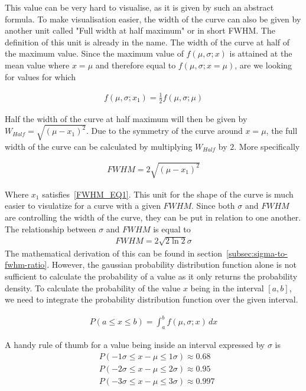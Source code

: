\documentclass[reprint,english,notitlepage]{revtex4-2}
\begin{document}
This value can be very hard to visualise, as it is given by such an abstract formula.
To make visualisation easier, the width of the curve can also be given by another unit called "Full width at half maximum" or in short FWHM.
The definition of this unit is already in the name. The width of the curve at half of the maximum value.
Since the maximum value of $f(\mu, \sigma; x)$ is attained at the mean value where $x=\mu$ and therefore equal to $f(\mu, \sigma; x=\mu)$, are we looking for values for which

\begin{align}
    f(\mu, \sigma; x_1) = \frac{1}{2} f(\mu, \sigma; \mu) \label{FWHM_EQ1}
\end{align}

Half the width of the curve at half maximum will then be given by $W_{Half} = \sqrt{(\mu - x_1)^2}$.
Due to the symmetry of the curve around $x =\mu$, the full width of the curve can be calculated by multiplying $W_{Half}$ by $2$.
More specifically

\begin{align*}
    FWHM = 2\sqrt{(\mu - x_1)^2}
\end{align*}

Where $x_1$ satisfies~\ref{FWHM_EQ1}. This unit for the shape of the curve is much easier to visulatize for a curve with a given $FWHM$.
Since both $\sigma$ and $FWHM$ are controlling the width of the curve, they can be put in relation to one another.
The relationship between $\sigma$ and $FWHM$ is equal to
\begin{align*}
    FWHM = 2\sqrt{2\ln2}\sigma
\end{align*}
The mathematical derivation of this can be found in section~\ref{subsec:sigma-to-fwhm-ratio}.
However, the gaussian probability distribution function alone is not sufficient to calculate the probability of a value as it only returns the probability density.
To calculate the probability of the value $x$ being in the interval $[a, b]$, we need to integrate the probability distribution function over the given interval.

\begin{align*}
    P(a ≤ x ≤ b) = \int_{a}^{b} f(\mu, \sigma; x) \, dx
\end{align*}

A handy rule of thumb for a value being inside an interval expressed by $\sigma$ is
\begin{align*}
    &P(-1\sigma ≤ x-\mu ≤ 1\sigma) ≈ 0.68\\
	&P(-2\sigma ≤ x-\mu ≤ 2\sigma) ≈ 0.95\\
	&P(-3\sigma ≤ x-\mu ≤ 3\sigma) ≈ 0.997
\end{align*}
\end{document}

